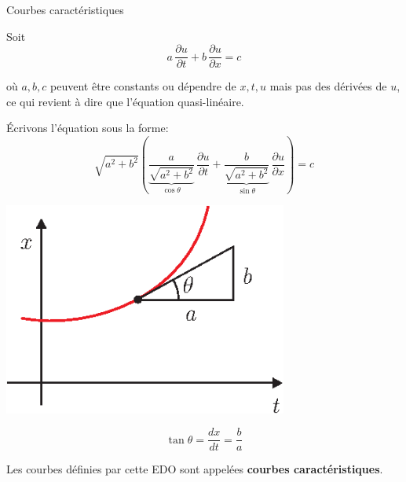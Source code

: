 \documentclass[
mode=present,    %
paper=a4paper,   %
orient=landscape,
display=slides,   %
size=10pt,
style=romain   %
]{powerdot}
\begin{document}
\begin{slide}[toc=Courbes caractéristiques]{Courbes caractéristiques}

Soit
\begin{equation*}
a\, \frac{\partial u}{\partial t} + b\, \frac{\partial u}{\partial x} = c
\end{equation*}

où $a, b, c$ peuvent être constants ou dépendre de $x, t, u$ mais pas des dérivées de $u$, ce qui revient à dire que
l'équation quasi-linéaire.

Écrivons l'équation sous la forme:
\begin{equation*}
\sqrt{a^2+b^2} \left( \underbrace{\frac{a}{\sqrt{a^2+b^2}}}_{\cos\theta}\, \frac{\partial u}{\partial t} + \underbrace{\frac{b}{\sqrt{a^2+b^2}}}_{\sin\theta}\, \frac{\partial u}{\partial x} \right) = c
\end{equation*}

\begin{minipage}[l]{\textwidth/2}
    \centerline{\includegraphics[width=0.7\textwidth]{intro1d.eps} }
\end{minipage}
\begin{minipage}[l]{\textwidth/2-1cm}
    \begin{equation*}
        \tan\theta = \boxed{ \frac{dx}{dt} = \frac{b}{a} }
    \end{equation*}

    \bigskip

    Les courbes définies par cette EDO sont appelées \textbf{courbes caractéristiques}.
\end{minipage}

\end{slide}
\end{document}
